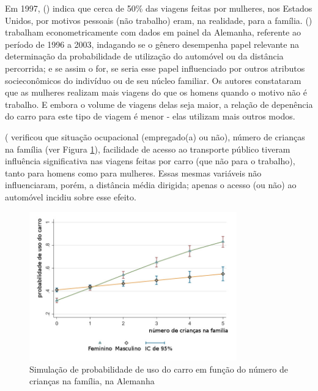 

Em 1997,  (\citeyear{ROOT1999}) indica que cerca de 50\% das viagens feitas por mulheres, nos Estados Unidos, por motivos pessoais (não trabalho) eram, na realidade, para a família.
 (\citeyear{VANCE2007}) trabalham econometricamente com dados em painel da Alemanha, referente ao período de 1996 a 2003, indagando se o gênero desempenha papel relevante na determinação da probabilidade de utilização do automóvel ou da distância percorrida; e se assim o for, se seria esse papel influenciado por outros atributos socieconômicos do indivíduo ou de seu núcleo familiar. 
Os autores constataram que as mulheres realizam mais viagens do que os homens quando o motivo não é trabalho. E embora o volume de viagens delas seja maior, a relação de depenência do carro para este tipo de viagem é menor - elas utilizam mais outros modos.




 (\citeyear{VANCE2007} verificou que situação ocupacional (empregado(a) ou não), número de crianças na família (ver Figura \ref{fig:prob-uso-carro}), facilidade de acesso ao transporte público tiveram influência significativa nas viagens feitas por carro (que não para o trabalho), tanto para homens como para mulheres. Essas mesmas variáveis não influenciaram, porém, a distância média dirigida; apenas o acesso (ou não) ao automóvel incidiu sobre esse efeito. 

\begin{figure}[htb]%
    \caption{\label{fig:prob-uso-carro}Simulação de probabilidade de uso do carro em função do número de crianças na família, na Alemanha}%
    \begin{center}%
        \includegraphics[width=0.8\textwidth]{./imagens/prob-uso-carro.jpg}%
    \end{center}%
\end{figure}%

